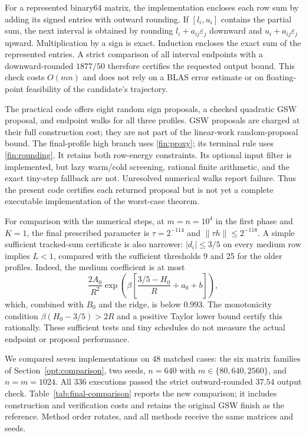 \documentclass[11pt]{amsart}
\theoremstyle{definition}\newtheorem{definition}[theorem]{Definition}
\theoremstyle{remark}\newtheorem{remark}[theorem]{Remark}
\numberwithin{equation}{section}
\begin{document}
For a represented binary64 matrix, the implementation encloses each
row sum by adding its signed entries with outward rounding. If
$[l_i,u_i]$ contains the partial sum, the next interval is obtained
by rounding $l_i+a_{ij}\varepsilon_j$ downward and
$u_i+a_{ij}\varepsilon_j$ upward. Multiplication by a sign is exact.
Induction encloses the exact sum of the represented entries. A strict
comparison of all interval endpoints with a downward-rounded
$1877/50$ therefore certifies the requested output bound.
This check costs $O(mn)$ and does not rely on a BLAS error estimate or
on floating-point feasibility of the candidate's trajectory.

The practical code offers eight random sign proposals, a checked
quadratic GSW proposal, and endpoint walks for all three profiles.
GSW proposals are charged at their full construction cost; they are not
part of the linear-work random-proposal bound.
The final-profile high branch uses \eqref{fin:proxy}; its terminal rule
uses \eqref{fin:rounding}. It retains both row-energy constraints.
Its optional input filter is implemented, but lazy warm/cold screening,
rational finite arithmetic, and the exact tiny-step fallback are not.
Unresolved numerical walks report failure. Thus the present code
certifies each returned proposal but is not yet a complete executable
implementation of the worst-case theorem.

For comparison with the numerical steps, at $m=n=10^4$ in the first
phase and $K=1$, the final prescribed parameter is $\tau=2^{-114}$
and $\|\tau h\|\le2^{-118}$. A simple sufficient tracked-sum certificate
is also narrower: $|d_i|\le3/5$ on every medium row implies $L<1$,
compared with the sufficient thresholds 9 and 25 for the older profiles.
Indeed, the medium coefficient is at most
\[
 \frac{2A_0}{R^2}
 \exp\left(\beta\left[\frac{3/5-H_0}{R}+a_0+b\right]\right),
\]
which, combined with $B_0$ and the ridge, is below $0.993$.
The monotonicity condition $\beta(H_0-3/5)>2R$ and a positive Taylor
lower bound certify this rationally. These sufficient tests and tiny
schedules do not measure the actual endpoint or proposal performance.

We compared seven implementations on 48 matched cases: the six matrix
families of Section~\ref{opt:comparison}, two seeds, $n=640$ with
$m\in\{80,640,2560\}$, and $n=m=1024$. All 336 executions passed the
strict outward-rounded $37.54$ output check. Table~\ref{tab:final-comparison}
reports the new comparison; it includes construction and verification
costs and retains the original GSW finish as the reference. Method order
rotates, and all methods receive the same matrices and seeds.
\end{document}

